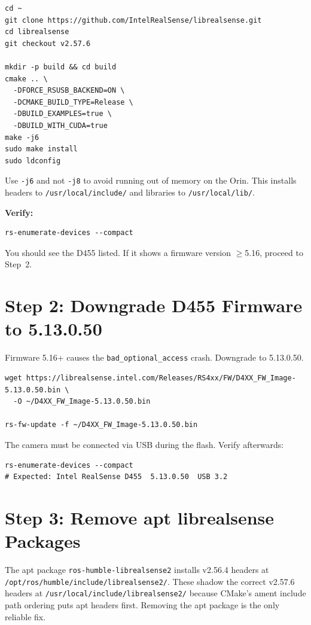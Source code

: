 \documentclass[11pt]{article}
\begin{document}
\begin{lstlisting}
cd ~
git clone https://github.com/IntelRealSense/librealsense.git
cd librealsense
git checkout v2.57.6

mkdir -p build && cd build
cmake .. \
  -DFORCE_RSUSB_BACKEND=ON \
  -DCMAKE_BUILD_TYPE=Release \
  -DBUILD_EXAMPLES=true \
  -DBUILD_WITH_CUDA=true
make -j6
sudo make install
sudo ldconfig
\end{lstlisting}

Use \texttt{-j6} and not \texttt{-j8} to avoid running out of memory on the Orin. This installs headers to \texttt{/usr/local/include/} and libraries to \texttt{/usr/local/lib/}.

\textbf{Verify:}
\begin{lstlisting}
rs-enumerate-devices --compact
\end{lstlisting}
You should see the D455 listed. If it shows a firmware version $\geq$5.16, proceed to Step~2.

\section{Step 2: Downgrade D455 Firmware to 5.13.0.50}

Firmware 5.16+ causes the \texttt{bad\_optional\_access} crash. Downgrade to 5.13.0.50.

\begin{lstlisting}
wget https://librealsense.intel.com/Releases/RS4xx/FW/D4XX_FW_Image-5.13.0.50.bin \
  -O ~/D4XX_FW_Image-5.13.0.50.bin

rs-fw-update -f ~/D4XX_FW_Image-5.13.0.50.bin
\end{lstlisting}

The camera must be connected via USB during the flash. Verify afterwards:

\begin{lstlisting}
rs-enumerate-devices --compact
# Expected: Intel RealSense D455  5.13.0.50  USB 3.2
\end{lstlisting}

\section{Step 3: Remove apt librealsense Packages}

The apt package \texttt{ros-humble-librealsense2} installs v2.56.4 headers at \texttt{/opt/ros/humble/include/librealsense2/}. These shadow the correct v2.57.6 headers at \texttt{/usr/local/include/librealsense2/} because CMake's ament include path ordering puts apt headers first. Removing the apt package is the only reliable fix.
\end{document}
